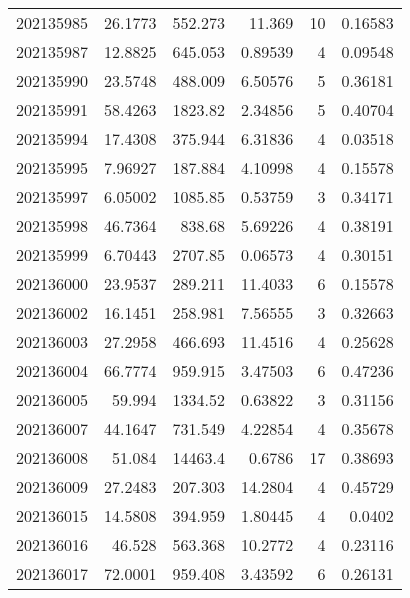 \begin{tabular}{rrrrrr}
 202135985 &         26.1773  &      552.273  &           11.369   &          10 & 0.16583 \\
 202135987 &         12.8825  &      645.053  &            0.89539 &           4 & 0.09548 \\
 202135990 &         23.5748  &      488.009  &            6.50576 &           5 & 0.36181 \\
 202135991 &         58.4263  &     1823.82   &            2.34856 &           5 & 0.40704 \\
 202135994 &         17.4308  &      375.944  &            6.31836 &           4 & 0.03518 \\
 202135995 &          7.96927 &      187.884  &            4.10998 &           4 & 0.15578 \\
 202135997 &          6.05002 &     1085.85   &            0.53759 &           3 & 0.34171 \\
 202135998 &         46.7364  &      838.68   &            5.69226 &           4 & 0.38191 \\
 202135999 &          6.70443 &     2707.85   &            0.06573 &           4 & 0.30151 \\
 202136000 &         23.9537  &      289.211  &           11.4033  &           6 & 0.15578 \\
 202136002 &         16.1451  &      258.981  &            7.56555 &           3 & 0.32663 \\
 202136003 &         27.2958  &      466.693  &           11.4516  &           4 & 0.25628 \\
 202136004 &         66.7774  &      959.915  &            3.47503 &           6 & 0.47236 \\
 202136005 &         59.994   &     1334.52   &            0.63822 &           3 & 0.31156 \\
 202136007 &         44.1647  &      731.549  &            4.22854 &           4 & 0.35678 \\
 202136008 &         51.084   &    14463.4    &            0.6786  &          17 & 0.38693 \\
 202136009 &         27.2483  &      207.303  &           14.2804  &           4 & 0.45729 \\
 202136015 &         14.5808  &      394.959  &            1.80445 &           4 & 0.0402  \\
 202136016 &         46.528   &      563.368  &           10.2772  &           4 & 0.23116 \\
 202136017 &         72.0001  &      959.408  &            3.43592 &           6 & 0.26131 \\

\end{tabular}
